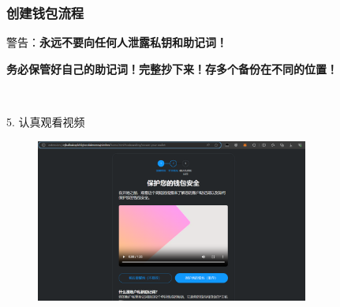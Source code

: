 \documentclass{beamer}
\begin{document}
\begin{frame}
    \frametitle{创建钱包流程}

    警告：\textbf{永远不要向任何人泄露私钥和助记词！}

    \textbf{务必保管好自己的助记词！完整抄下来！存多个备份在不同的位置！}

    \

    5. 认真观看视频

    \begin{figure}[htbp]
        \centering
        \includegraphics[width=0.8\textwidth]{m5.png}
    \end{figure}

\end{frame}
\end{document}
